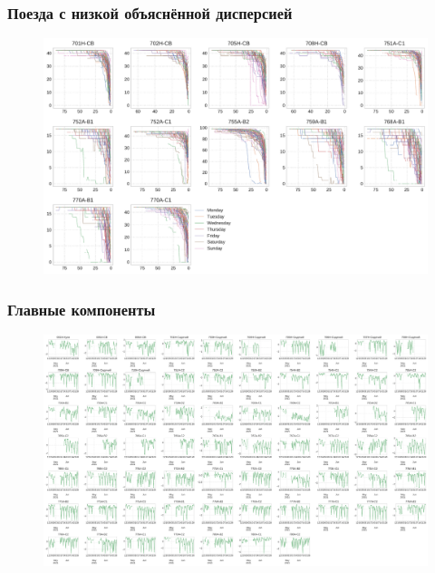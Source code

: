\documentclass[11pt,aspectratio=169]{beamer}
\begin{document}
\begin{frame}
    \frametitle{Поезда с низкой объяснённой дисперсией}

    \begin{figure}
        \centering
        \includegraphics[height=0.92\textheight]{../data/figures/poorly_explained.pdf}
    \end{figure}

\end{frame}


\begin{frame}
    \frametitle{Главные компоненты}

    \begin{figure}
        \centering
        \includegraphics[height=0.92\textheight]{../data/figures/pcs.pdf}
    \end{figure}

\end{frame}
\end{document}
